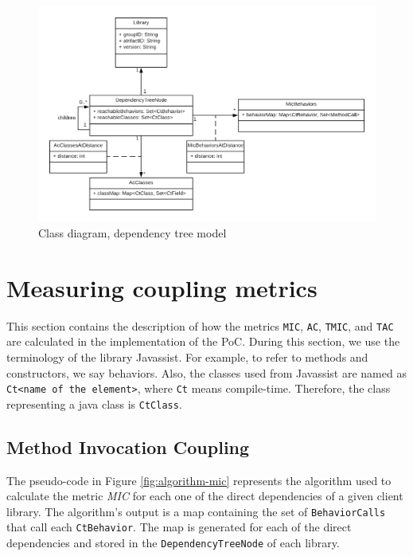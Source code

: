 \begin{figure}[ht]
\begin{center}
\includegraphics[width=\textwidth]{figures/Thesis-ModelClassDiagram.png}
\caption{Class diagram, dependency tree model}
\label{fig:class-diagram-tree}
\end{center}
\end{figure}

\section{Measuring coupling metrics}
This section contains the description of how the metrics \texttt{MIC}, \texttt{AC}, \texttt{TMIC}, and \texttt{TAC} are calculated in the implementation of the PoC. During this section, we use the terminology of the library Javassist. For example, to refer to methods and constructors, we say behaviors. Also, the classes used from Javassist are named as \texttt{Ct<name of the element>}, where \texttt{Ct} means compile-time. Therefore, the class representing a java class is \texttt{CtClass}.

\subsection{Method Invocation Coupling}
The pseudo-code in Figure \ref{fig:algorithm-mic} represents the algorithm used to calculate the metric \textit{MIC} for each one of the direct dependencies of a given client library. The algorithm's output is a map containing the set of \texttt{BehaviorCalls} that call each \texttt{CtBehavior}. The map is generated for each of the direct dependencies and stored in the \texttt{DependencyTreeNode} of each library.

